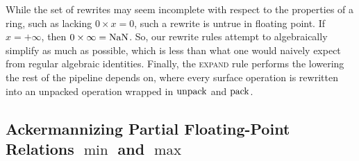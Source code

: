 \begin{figure}
\vspace{-2em}
\centering
\small
\begin{minipage}{0.38\textwidth}
\end{minipage}
\end{figure}

While the set of rewrites may seem incomplete with respect to the properties of a ring,
such as lacking $0 \times x = 0$, such a rewrite is untrue in floating point.
If $x = +\infty$, then $0 \times \infty = \mathrm{NaN}$.
So, our rewrite rules attempt to algebraically simplify as much as possible,
which is less than what one would naively expect from regular algebraic identities.
Finally, the \textsc{expand} rule performs the lowering the rest of the pipeline depends on,
where every surface operation is rewritten into an unpacked operation wrapped in $\mathrm{unpack}$ and $\mathrm{pack}$.

\subsection{Ackermannizing Partial Floating-Point Relations $\min$ and $\max$}\label{sec:fp:ackermannization}

